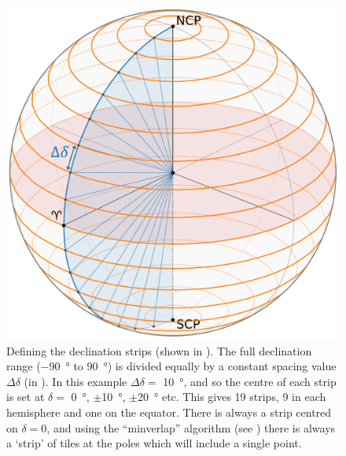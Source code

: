 \begin{colsection}
\clearpage

\begin{figure}[t]
    \begin{center}
        \includegraphics[width=\linewidth]{images/globe2.pdf}
    \end{center}
    \caption[Defining declination strips]{
        Defining the declination strips (shown in ). The full declination range (\SI{-90}{\degree} to \SI{90}{\degree}) is divided equally by a constant spacing value $\Delta\delta$ (in ). In this example $\Delta\delta =$ \SI{10}{\degree}, and so the centre of each strip is set at $\delta=$ \SI{0}{\degree}, $\pm$\SI{10}{\degree}, $\pm$\SI{20}{\degree} etc. This gives 19 strips, 9 in each hemisphere and one on the equator. There is always a strip centred on $\delta=0$, and using the ``minverlap'' algorithm (see ) there is always a `strip' of tiles at the poles which will include a single point.
    }\label{fig:deltadelta}
\end{figure}

\clearpage


\end{colsection}
